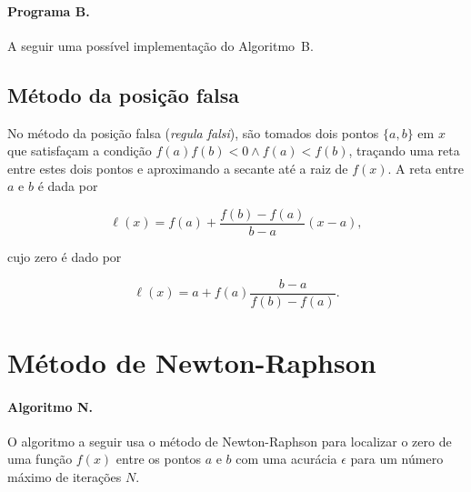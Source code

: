 \pagebreak

\paragraph{Programa B.} A seguir uma possível implementação 
do Algoritmo~B.



\subsection*{Método da posição falsa}

No método da posição falsa ({\it regula falsi\/}), 
são tomados dois pontos $\{a,b\}$ em $x$ que satisfaçam 
a condição $f(a)f(b)<0 \land f(a)<f(b)$, traçando 
uma reta entre estes dois pontos e aproximando a 
secante até a raiz de $f(x)$. A reta entre $a$ 
e $b$ é dada por

\begin{equation}
	\ell(x) = f(a) + \frac{f(b)-f(a)}{b-a}(x-a),
\end{equation}

\noindent cujo zero é dado por

\begin{equation}
	\ell(x) = a + f(a)\frac{b-a}{f(b)-f(a)}.
\end{equation}


\section{Método de Newton-Raphson}

\paragraph{Algoritmo N.}
O algoritmo a seguir usa 
o método de Newton-Raphson
para localizar o zero de uma função $f(x)$ 
entre os pontos $a$ e $b$
com uma acurácia $\epsilon$ para um número máximo 
de iterações $N$. 


